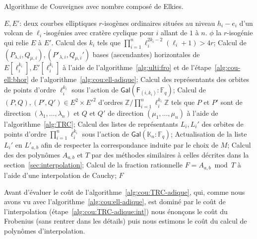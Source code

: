 \documentclass[10pt,a4paper]{book}
\theoremstyle{plain}
\theoremstyle{definition}
\theoremstyle{definition}
\theoremstyle{definition}
\theoremstyle{definition}
\theoremstyle{definition}
\theoremstyle{remark}
\theoremstyle{remark}
\theoremstyle{definition}
\begin{document}
\begin{algorithm}
\caption{\label{alg:cou:TRC-adique} Algorithme de Couveignes avec nombre composé de Elkies.}
\begin{algorithmic}[1]
\REQUIRE $E,E'$: deux courbes elliptiques $r$-isogènes ordinaires situées au niveau $h_i-e_i$ d'un volcan de $\ell_i$-isogénies avec cratère cyclique pour $i$ allant de $1$ à $n$.
\ENSURE $\phi$ la $r$-isogénie qui relie $E$ à $E'$.
\STATE Calcul des $k_i$ tels que $\prod_{i=1}^n\ell_{i}^{2k_{i}-2}(\ell_{i}+1)>4r$;
\STATE \label{alg:cou:TRC-adique:bhor} Calcul de $(P_{\lambda,i},Q_{\mu,i}),
(P'_{\lambda,i},Q_{\mu,i}')$ bases (ascendantes) horizontales de 
$E[\ell_i^{k_i}],E'[\ell_i^{k_i}]$ à l'aide de l'algorithme~\ref{alg:ulti:fro} 
et de l'étape~\ref{alg:cou-ell:bhor} de l'algorithme~\ref{alg:cou:ell-adique};
\STATE \label{alg:cou:TRC_adique:rep:uni} Calcul des représentants des orbites de points d'ordre $\ell_i^{k_i}$ sous l'action de $\mathsf{Gal}(\mathsf{F}_{(i,k_i)}:\mathbb{F}_q)$;
\ENDFOR
\STATE \label{alg:cou:TRC-adique:TRC} Calcul de $(P,Q),(P',Q') \in E^2 \times E'^2$ d'ordres $ \mathbb{Z}/\prod_{i=1}^n \ell_i^{k_i}\mathbb{Z}$ tels que $P$ et $P'$ sont de direction $(\lambda_1, \dots, \lambda_n)$ et $Q$ et $Q'$ de direction $(\mu_1, \dots, \mu_n)$ à l'aide de l'algorithme~\ref{alg:TRC};
\STATE \label{alg:cou:TRC-adique:rep} Calcul des listes de représentants $L_i,L_i'$ des orbites de points d'ordre $\prod_{i=1}^n \ell_i^{k_i}$ sous l'action de $\mathsf{Gal}(\mathbb{K}_n:\mathbb{F}_q)$;
\STATE \label{alg:cou:TRC-adique:ord} Actualisation de la liste $L_i'$ en $L'_{a,b}$ afin de respecter la correspondance induite par le choix de $M$;
\STATE \label{alg:cou:TRC-adique:int} Calcul des des polynômes $A_{a,b}$ et $T$ par des méthodes similaires à celles décrites dans la section~\ref{sec:interpolation};
\STATE \label{alg:cou:TRC-adique:Cauchy} Calcul de la fraction rationnelle $F=A_{a,b} \bmod T$ à l'aide d'une interpolation de Cauchy;
 \label{alg:cou:TRC-adique:test}
\RETURN $F$
\ENDIF
\ENDFOR 
\end{algorithmic}
\end{algorithm}

Avant d'évaluer le coût de l'algorithme~\ref{alg:cou:TRC-adique}, qui, comme nous
avons vu avec l'algorithme~\ref{alg:cou:ell-adique}, est dominé par le coût de 
l'interpolation (étape~\ref{alg:cou:TRC-adique:int}) nous énonçons le coût du
Frobenius (sans rentrer dans les détails) puis nous estimons le coût du calcul 
de polynômes d'interpolation. 
\end{document}

